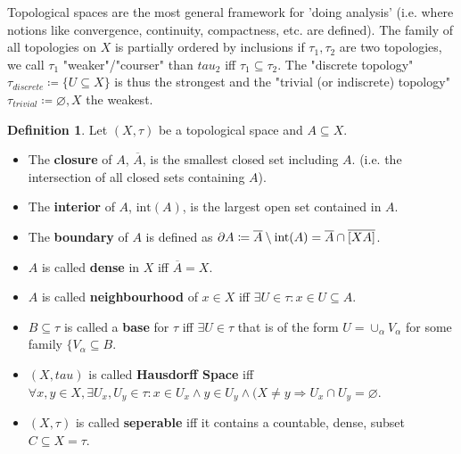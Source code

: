 \documentclass[10pt,a4paper]{article}
\theoremstyle{definition}
\newtheorem{definition}{Definition}
\theoremstyle{cor}
\theoremstyle{theorem}
\theoremstyle{lemma}
\theoremstyle{example}
\begin{document}
\noindent Topological spaces are the most general framework for 'doing analysis' (i.e. where notions like convergence, continuity, compactness, etc. are defined).  The family of all topologies on $X$ is partially ordered by inclusions if $\tau_1, \tau_2$ are two topologies, we call $\tau_1$ "weaker"/"courser" than $tau_2$ iff $\tau_1 \subseteq \tau_2$. The "discrete topology" $\tau_{discrete} \coloneqq  \{U \subseteq X\}$ is thus the strongest and the "trivial (or indiscrete) topology" $\tau_{trivial}\coloneqq {\varnothing, X}$ the weakest.

\begin{definition}
Let $(X, \tau)$ be a topological space and $A \subseteq X$.
\begin{itemize}
\item The \textbf{closure} of $A$, $\overline{A}$, is the smallest closed set including $A$. (i.e. the intersection of all closed sets containing $A$).
\item The \textbf{interior} of $A$, $\text{int}(A)$, is the largest open set contained in $A$.
\item The \textbf{boundary} of $A$ is defined as $\partial A \coloneqq \overline{A} \setminus \text{int}(A) =  \overline{A} \cap \overline{[X\\A]}$.
\item $A$ is called \textbf{dense} in $X$ iff $\overline{A} = X$.
\item $A$ is called \textbf{neighbourhood} of $x\in X$ iff $\exists U \in \tau : x\in U \subseteq A$.
\item $B \subseteq \tau$ is called a \textbf{base} for $\tau$ iff $\exists U \in \tau$ that is of the form $U = \cup_{\alpha} V_{\alpha}$ for some family $\{ V_{\alpha} \subseteq B$.
\item $(X, tau)$ is called \textbf{Hausdorff Space} iff $\forall x, y \in X, \exists U_x, U_y \in \tau : x\in U_x \wedge y\in U_y \wedge (X \neq y \Rightarrow U_x \cap U_y = \varnothing$.
\item $(X, \tau)$ is called \textbf{seperable} iff it contains a countable, dense, subset $C \subseteq X = \tau$.
\end{itemize}
\end{definition}
\end{document}

